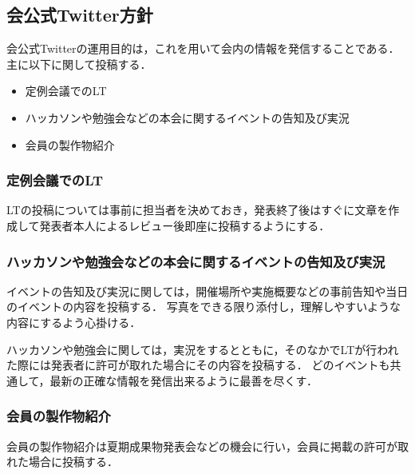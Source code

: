 \subsection*{会公式Twitter方針}



会公式Twitterの運用目的は，これを用いて会内の情報を発信することである．
主に以下に関して投稿する．

\begin{itemize}
\item 定例会議でのLT
\item ハッカソンや勉強会などの本会に関するイベントの告知及び実況
\item 会員の製作物紹介
\end{itemize}

\subsubsection*{定例会議でのLT}
LTの投稿については事前に担当者を決めておき，発表終了後はすぐに文章を作成して発表者本人によるレビュー後即座に投稿するようにする．

\subsubsection*{ハッカソンや勉強会などの本会に関するイベントの告知及び実況}
イベントの告知及び実況に関しては，開催場所や実施概要などの事前告知や当日のイベントの内容を投稿する．
写真をできる限り添付し，理解しやすいような内容にするよう心掛ける．

ハッカソンや勉強会に関しては，実況をするとともに，そのなかでLTが行われた際には発表者に許可が取れた場合にその内容を投稿する．
どのイベントも共通して，最新の正確な情報を発信出来るように最善を尽くす．

\subsubsection*{会員の製作物紹介}
会員の製作物紹介は夏期成果物発表会などの機会に行い，会員に掲載の許可が取れた場合に投稿する．
